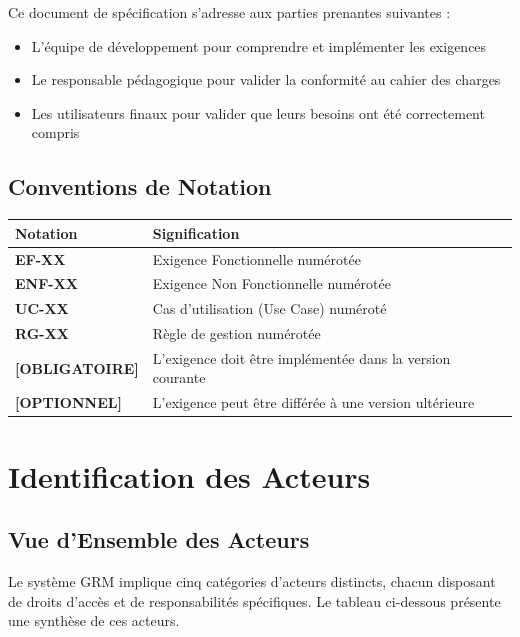 \documentclass[12pt,a4paper]{report}
\begin{document}
Ce document de spécification s'adresse aux parties prenantes suivantes :
\begin{itemize}[leftmargin=1.5cm]
    \item L'équipe de développement pour comprendre et implémenter les exigences
    \item Le responsable pédagogique pour valider la conformité au cahier des charges
    \item Les utilisateurs finaux pour valider que leurs besoins ont été correctement compris
\end{itemize}

\section{Conventions de Notation}

\begin{tabularx}{\textwidth}{|C{2cm}|L{10cm}|}
\hline
{}\textbf{Notation} & \textbf{Signification} \\
\hline
\textbf{EF-XX} & Exigence Fonctionnelle numérotée \\
\hline
\textbf{ENF-XX} & Exigence Non Fonctionnelle numérotée \\
\hline
\textbf{UC-XX} & Cas d'utilisation (Use Case) numéroté \\
\hline
\textbf{RG-XX} & Règle de gestion numérotée \\
\hline
\textbf{[OBLIGATOIRE]} & L'exigence doit être implémentée dans la version courante \\
\hline
\textbf{[OPTIONNEL]} & L'exigence peut être différée à une version ultérieure \\
\hline
\end{tabularx}

\chapter{Identification des Acteurs}

\section{Vue d'Ensemble des Acteurs}

Le système GRM implique cinq catégories d'acteurs distincts, chacun disposant de droits d'accès et de responsabilités spécifiques. Le tableau ci-dessous présente une synthèse de ces acteurs.
\end{document}
